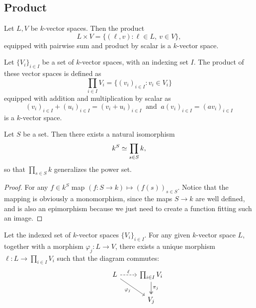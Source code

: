 \subsection{Product}

\begin{definition}
Let \(L, V\) be \(k\)-vector spaces. Then the product
\[
  L \times V = \{(\ell, v) \colon \ell \in L,\ v \in V\},
\]
equipped with pairwise sum and product by scalar is a \(k\)-vector space.
\end{definition}

\begin{definition}
Let \(\{V_i\}_{i \in I}\) be a set of \(k\)-vector spaces, with an indexing
set \(I\). The product of these vector spaces is defined as
\[
  \prod_{i \in I} V_i = \{(v_i)_{i \in I} \colon v_i \in V_i\}
\]
equipped with addition and multiplication by scalar as
\[
  (v_i)_{i \in I} + (u_i)_{i \in I} = (v_i + u_i)_{i \in I}\ \text{ and }\
  a(v_i)_{i \in I} = (av_i)_{i \in I}
\]
is a \(k\)-vector space.
\end{definition}

\begin{proposition}
Let \(S\) be a set. Then there exists a natural isomorphism
\[
  k^S \simeq \prod_{s \in S} k,
\]
so that \(\prod_{s \in S} k\) generalizes the power set.
\end{proposition}

\begin{proof}
For any \(f \in k^S\) map \((f : S \to k) \mapsto (f(s))_{s \in S}\). Notice
that the mapping is obviously a monomorphism, since the maps \(S \to k\) are
well defined, and is also an epimorphism because we just need to create
a function fitting such an image.
\end{proof}

\begin{proposition}
Let the indexed set of \(k\)-vector spaces \(\{V_i\}_{i \in I}\). For any
given \(k\)-vector space \(L\), together with a morphism \(\varphi_j : L \to
V\), there exists a unique morphism \(\ell : L \to \prod_{i \in I} V_i\) such
that the diagram commutes:
\[
  \begin{tikzcd}
      &L
      \ar[r, dashed, "\ell"]
      \ar[dr, swap, "\varphi_j"]
        &\prod_{i \in I} V_i
        \ar[d, "\pi_j", two heads] \\
      &
        &V_j
  \end{tikzcd}
\]
\end{proposition}

